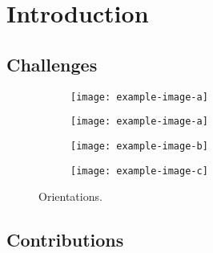 \chapter{Introduction}
\lipsum[1-2]

\section{Challenges}\label{section:challanges}
\lipsum[1-2]
\begin{figure}[ht!]
	\centering
	\begin{subfigure}[ht!]{0.24\linewidth}
		\centering\texttt{[image: example-image-a]}
		\caption{\label{figure:parallel-horizontal-orientation}}
	\end{subfigure}%
	\hfill
	\centering
	\begin{subfigure}[ht!]{0.24\linewidth}
		\centering\texttt{[image: example-image-a]}
		\caption{\label{figure:parallel-vertical-orientation}}
	\end{subfigure}%
	\hfill
	\begin{subfigure}[ht!]{0.24\linewidth}
		\centering\texttt{[image: example-image-b]}
		\caption{\label{figure:oblique-orientation}}
	\end{subfigure}%
	\hfill
	\begin{subfigure}[ht!]{0.24\linewidth}
		\centering\texttt{[image: example-image-c]}
		\caption{\label{figure:perpendicular-orientation}}
	\end{subfigure}
	\caption{Orientations.}
\end{figure}

\section{Contributions}
\lipsum[1-2]
